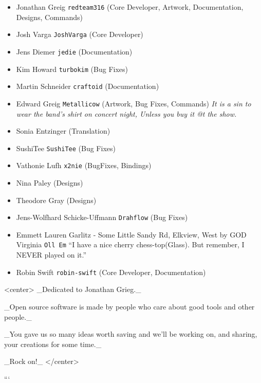\begin{itemize}
\item Jonathan Greig \texttt{redteam316} (Core Developer, Artwork, Documentation, Designs, Commands)
\item Josh Varga \texttt{JoshVarga} (Core Developer)
\item Jens Diemer \texttt{jedie} (Documentation)
\item Kim Howard \texttt{turbokim} (Bug Fixes)
\item Martin Schneider \texttt{craftoid} (Documentation)
\item Edward Greig \texttt{Metallicow} (Artwork, Bug Fixes, Commands)
    \emph{It is a sin to wear the band's shirt on concert night, Unless you buy it @t the show.}
\item Sonia Entzinger (Translation)
\item SushiTee \texttt{SushiTee} (Bug Fixes)
\item Vathonie Lufh \texttt{x2nie} (BugFixes, Bindings)
\item Nina Paley (Designs)
\item Theodore Gray (Designs)
\item Jens-Wolfhard Schicke-Uffmann \texttt{Drahflow} (Bug Fixes)
\item Emmett Lauren Garlitz - Some Little Sandy Rd, Elkview, West by GOD Virginia \texttt{Oll Em}
    ``I have a nice cherry chess-top(Glass). But remember, I NEVER played on it.''
\item Robin Swift \texttt{robin-swift} (Core Developer, Documentation)
\end{itemize}
<center>
_Dedicated to Jonathan Grieg._
    
_Open source software is made by people who care about good tools and other people._

_You gave us so many ideas worth saving and we'll be working on, and sharing, your creations for some time._
        
_Rock on!_
</center>

```
\documentclass[a4paper]{report}

\usepackage[utf8]{inputenc}
\usepackage[T1]{fontenc}

\usepackage[english]{babel} %


\usepackage{hyperref}
\hypersetup{colorlinks, 
           citecolor=black,
           filecolor=black,
           linkcolor=black,
           urlcolor=black,
           bookmarksopen=true,
           pdftex}

